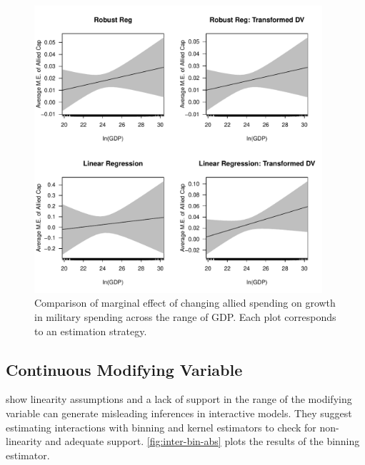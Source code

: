 \documentclass[12pt]{article}
\begin{document}
\begin{figure}[htbp]
	\centering
		\includegraphics[width=0.95\textwidth]{me-plots.pdf}
	\caption{Comparison of marginal effect of changing allied spending on growth in military spending across the range of GDP. Each plot corresponds to an estimation strategy.}
	\label{fig:me-plots}
\end{figure}



\subsection{Continuous Modifying Variable}


\citet{Hainmuelleretal2019} show linearity assumptions and a lack of support in the range of the modifying variable can generate misleading inferences in interactive models. 
They suggest estimating interactions with binning and kernel estimators to check for non-linearity and adequate support. 
\autoref{fig:inter-bin-abs} plots the results of the binning estimator. 
\end{document}
